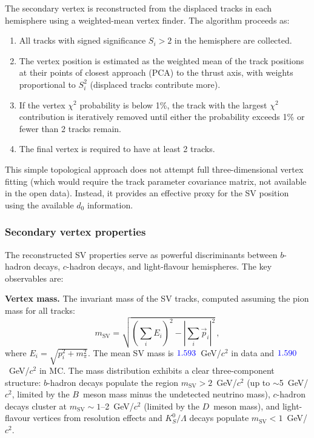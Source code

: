 \documentclass[11pt,a4paper]{article}
\newcommand{\measured}[1]{\textcolor{blue}{#1}}
\begin{document}
The secondary vertex is reconstructed from the displaced tracks in each
hemisphere using a weighted-mean vertex finder.  The algorithm proceeds as:
\begin{enumerate}
\item All tracks with signed significance $S_i > 2$ in the hemisphere are
  collected.
\item The vertex position is estimated as the weighted mean of the track
  positions at their points of closest approach (PCA) to the thrust axis,
  with weights proportional to $S_i^2$ (displaced tracks contribute more).
\item If the vertex $\chi^2$ probability is below 1\%, the track with the
  largest $\chi^2$ contribution is iteratively removed until either the
  probability exceeds 1\% or fewer than 2 tracks remain.
\item The final vertex is required to have at least 2 tracks.
\end{enumerate}

This simple topological approach does not attempt full three-dimensional
vertex fitting (which would require the track parameter covariance matrix,
not available in the open data).  Instead, it provides an effective
proxy for the SV position using the available $d_0$ information.

\subsubsection{Secondary vertex properties}

The reconstructed SV properties serve as powerful discriminants between
$b$-hadron decays, $c$-hadron decays, and light-flavour hemispheres.
The key observables are:

\textbf{Vertex mass.}
The invariant mass of the SV tracks, computed assuming the pion mass for
all tracks:
\begin{equation}
  m_\mathrm{SV} = \sqrt{\left(\sum_i E_i\right)^2 -
    \left|\sum_i \vec{p}_i\right|^2}\,,
\end{equation}
where $E_i = \sqrt{p_i^2 + m_\pi^2}$.  The mean SV mass is
$\measured{1.593}$~GeV/$c^2$ in data and $\measured{1.590}$~GeV/$c^2$
in MC.  The mass distribution exhibits a clear three-component structure:
$b$-hadron decays populate the region $m_\mathrm{SV} > 2$~GeV/$c^2$
(up to $\sim$5~GeV/$c^2$, limited by the $B$~meson mass minus the
undetected neutrino mass), $c$-hadron decays cluster at
$m_\mathrm{SV} \sim 1$--2~GeV/$c^2$ (limited by the $D$~meson mass),
and light-flavour vertices from resolution effects and $K_S^0/\Lambda$
decays populate $m_\mathrm{SV} < 1$~GeV/$c^2$.
\end{document}
